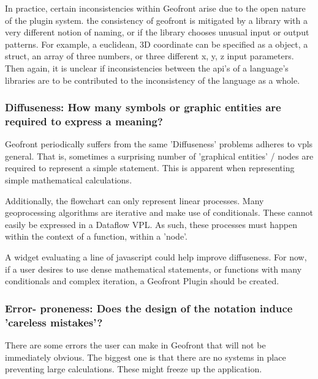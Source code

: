 In practice, certain inconsistencies within Geofront arise due to the open nature of the plugin system. 
the consistency of geofront is mitigated by a library with a very different notion of naming, or if the library chooses unusual input or output patterns. 
For example, a euclidean, 3D coordinate can be specified as a  object, a struct, an array of three numbers, or three different x, y, z input parameters.
Then again, it is unclear if inconsistencies between the api's of a language's libraries are to be contributed to the inconsistency of the language as a whole. 


\subsubsection*{Diffuseness: How many symbols or graphic entities are required to express a meaning?}

Geofront periodically suffers from the same 'Diffuseness' problems \cite[]{green_usability_1996} adheres to vpls general. 
That is, sometimes a surprising number of 'graphical entities' / nodes are required to represent a simple statement.  
This is apparent when representing simple mathematical calculations. 

Additionally, the flowchart can only represent linear processes. Many geoprocessing algorithms are iterative and make use of conditionals. These cannot easily be expressed in a Dataflow VPL. As such, these processes must happen within the context of a function, within a 'node'.

A widget evaluating a line of javascript could help improve diffuseness. For now, if a user desires to use dense mathematical statements, or functions with many conditionals and complex iteration, a Geofront Plugin should be created.



\subsubsection*{Error- proneness: Does the design of the notation induce 'careless mistakes'?}

There are some errors the user can make  in Geofront that will not be immediately obvious. 
The biggest one is that there are no systems in place preventing large calculations. 
These might freeze up the application. 

